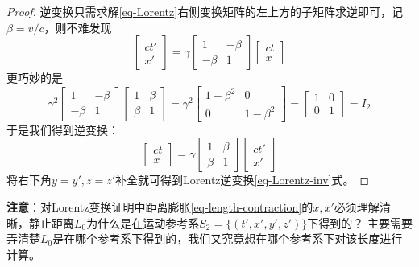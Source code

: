 \documentclass[12pt, a4paper, oneside]{ctexart}
\numberwithin{equation}{section}  %
\begin{document}
\begin{proof}
    逆变换只需求解\ref{eq-Lorentz}右侧变换矩阵的左上方的子矩阵求逆即可，记$\beta = v/c$，则不难发现
    \begin{equation}
        \begin{bmatrix}
            ct'\\x'
        \end{bmatrix} = \gamma\begin{bmatrix}
            1&-\beta\\-\beta&1
        \end{bmatrix}\begin{bmatrix}
            ct\\x
        \end{bmatrix}
    \end{equation}
    更巧妙的是
    \begin{equation}
        \gamma^2\begin{bmatrix}
            1&-\beta\\-\beta&1
        \end{bmatrix}\begin{bmatrix}
            1&\beta\\\beta&1
        \end{bmatrix} = \gamma^2\begin{bmatrix}
            1-\beta^2&0\\0&1-\beta^2
        \end{bmatrix} = \begin{bmatrix}
            1&0\\0&1
        \end{bmatrix} = I_2
    \end{equation}
    于是我们得到逆变换：
    \begin{equation}
        \begin{bmatrix}
            ct\\x
        \end{bmatrix}=\gamma\begin{bmatrix}
            1&\beta\\\beta&1
        \end{bmatrix}\begin{bmatrix}
            ct'\\x'
        \end{bmatrix}
    \end{equation}
    将右下角$y=y',z=z'$补全就可得到Lorentz逆变换\ref{eq-Lorentz-inv}式。
\end{proof}
\textbf{注意}：对Lorentz变换证明中距离膨胀\ref{eq-length-contraction}的$x,x'$必须理解清晰，静止距离$L_0$为什么是在运动参考系$S_2=\{(t',x',y',z')\}$下得到的？
主要需要弄清楚$L_0$是在哪个参考系下得到的，我们又究竟想在哪个参考系下对该长度进行计算。
\end{document}
